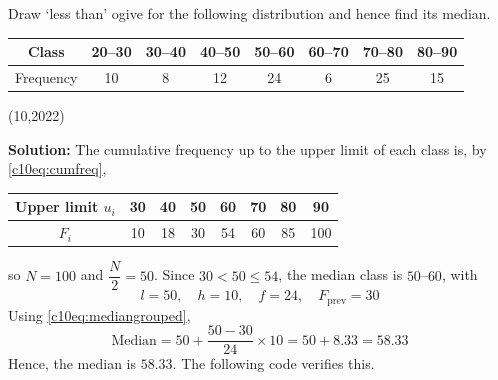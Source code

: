 \clearpage
\item Draw `less than' ogive for the following distribution and hence find its median.
\begin{center}
\begin{tabular}{c|ccccccc}
Class & 20--30 & 30--40 & 40--50 & 50--60 & 60--70 & 70--80 & 80--90 \\ \hline
Frequency & 10 & 8 & 12 & 24 & 6 & 25 & 15
\end{tabular}
\end{center}
\hfill (10,2022)

\textbf{Solution:} The cumulative frequency up to the upper limit of each class is, by \eqref{c10eq:cumfreq},
\begin{center}
\begin{tabular}{c|ccccccc}
Upper limit $u_i$ & 30 & 40 & 50 & 60 & 70 & 80 & 90 \\ \hline
$F_i$ & 10 & 18 & 30 & 54 & 60 & 85 & 100
\end{tabular}
\end{center}
so $N = 100$ and $\dfrac{N}{2} = 50$. Since $30 < 50 \le 54$, the median class is $50$--$60$, with
\begin{equation}
l = 50, \quad h = 10, \quad f = 24, \quad F_{\text{prev}} = 30
\end{equation}
Using \eqref{c10eq:mediangrouped},
\begin{equation}
\text{Median} = 50 + \frac{50 - 30}{24} \times 10 = 50 + 8.33 = 58.33
\end{equation}
Hence, the median is $58.33$. The following code verifies this.

\nopagebreak[4]
\begin{center}
\end{center}
